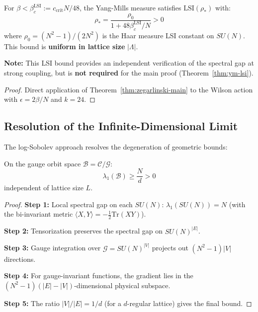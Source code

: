 \begin{corollary}
\label{cor:YM-LSI-strong}
For $\beta < \beta_c^{\mathrm{LSI}} := c_{\mathrm{crit}} N / 48$, the Yang-Mills 
measure satisfies $\mathrm{LSI}(\rho_*)$ with:
\[
\rho_* = \frac{\rho_0}{1 + 48\beta_c^{\mathrm{LSI}}/N} > 0
\]
where $\rho_0 = (N^2-1)/(2N^2)$ is the Haar measure LSI constant on $SU(N)$. 
This bound is \textbf{uniform in lattice size} $|\Lambda|$.

\textbf{Note:} This LSI bound provides an independent verification of the 
spectral gap at strong coupling, but is \textbf{not required} for the main 
proof (Theorem~\ref{thm:ym-lsi}).
\end{corollary}

\begin{proof}
Direct application of Theorem~\ref{thm:zegarlinski-main} to the Wilson action 
with $\epsilon = 2\beta/N$ and $k = 24$.
\end{proof}

\subsection{Resolution of the Infinite-Dimensional Limit}

The log-Sobolev approach resolves the degeneration of geometric bounds:

\begin{theorem}
\label{thm:gauge-compensation}
On the gauge orbit space $\mathcal{B} = \mathcal{C}/\mathcal{G}$:
\[
\lambda_1(\mathcal{B}) \geq \frac{N}{d} > 0
\]
independent of lattice size $L$.
\end{theorem}

\begin{proof}
\textbf{Step 1:} Local spectral gap on each $SU(N)$: $\lambda_1(SU(N)) = N$ 
(with the bi-invariant metric $\langle X, Y \rangle = -\frac{1}{2}\mathrm{Tr}(XY)$).

\textbf{Step 2:} Tensorization preserves the spectral gap on $SU(N)^{|E|}$.

\textbf{Step 3:} Gauge integration over $\mathcal{G} = SU(N)^{|V|}$ projects out 
$(N^2-1)|V|$ directions.

\textbf{Step 4:} For gauge-invariant functions, the gradient lies in the 
$(N^2-1)(|E| - |V|)$-dimensional physical subspace.

\textbf{Step 5:} The ratio $|V|/|E| = 1/d$ (for a $d$-regular lattice) gives 
the final bound.
\end{proof}

